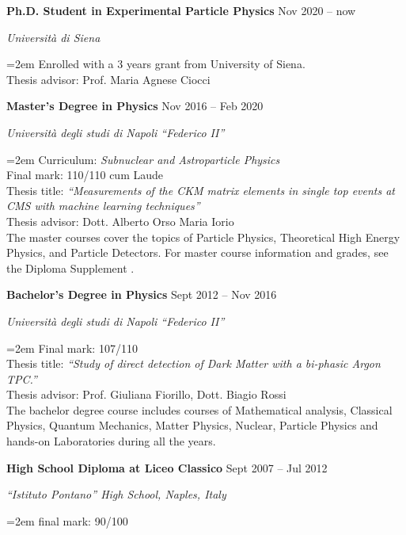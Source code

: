 \documentclass[fontsize=12pt]{article} %
\newcommand{\openquote}{``}
\newcommand{\closequote}{''}
\newcommand{\sepspace}{\vspace*{1em}}		%
\newcommand{\EducationEntry}[4]{
	\noindent \textbf{#1} \hfill      %
	{#2} \par  %
	\noindent \textit{#3} \par        %
	\noindent\hangindent=2em\hangafter=0 \small #4 %
	\normalsize \par}
\begin{document}
	\EducationEntry{Ph.D. Student in Experimental Particle Physics}{Nov 2020 {--} now}{Università di Siena}{Enrolled with a 3 years grant from University of Siena.\\Thesis advisor: Prof. Maria Agnese Ciocci}
	\sepspace
	\EducationEntry{Master's Degree in Physics}{Nov 2016 {--} Feb 2020}{Università degli studi di Napoli \openquote Federico II\closequote}{Curriculum: \textit{Subnuclear and Astroparticle Physics} \\Final mark: 110/110 cum Laude\\
	Thesis title: \textit{``Measurements of the CKM matrix elements in single top events at
			CMS with machine learning techniques''}  \cite{thesis}\\
		Thesis advisor: Dott. Alberto Orso Maria Iorio\\ The master courses cover the topics of Particle Physics, Theoretical High Energy Physics, and Particle Detectors. For master course information and grades, see the Diploma Supplement \cite{diploma_supplement}.	}
	\sepspace
	\EducationEntry{Bachelor's Degree in Physics}{Sept 2012 {--} Nov 2016}{Università degli studi di Napoli \openquote Federico II\closequote}
	{Final mark:  107/110\\
		Thesis title: \textit{``Study of direct detection of Dark Matter with a bi-phasic Argon TPC.''}\\
		Thesis advisor: Prof. Giuliana Fiorillo, Dott. Biagio Rossi \\
		The bachelor degree course includes courses of Mathematical analysis, Classical Physics, Quantum Mechanics, Matter Physics, Nuclear, Particle Physics and hands-on Laboratories during all the years.}
\sepspace
\EducationEntry{High School Diploma at Liceo Classico}{Sept 2007 {--} Jul 2012}{``Istituto Pontano'' High School, Naples, Italy}
{final mark: 90/100}
\sepspace
\end{document}
